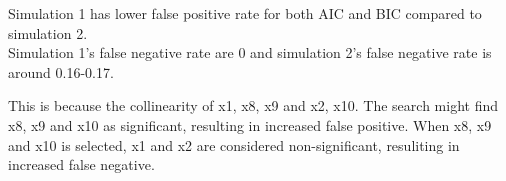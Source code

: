 \documentclass[
]{article}
\begin{document}
Simulation 1 has lower false positive rate for both AIC and BIC compared
to simulation 2.\\
Simulation 1's false negative rate are 0 and simulation 2's false
negative rate is around 0.16-0.17.

This is because the collinearity of x1, x8, x9 and x2, x10. The search
might find x8, x9 and x10 as significant, resulting in increased false
positive. When x8, x9 and x10 is selected, x1 and x2 are considered
non-significant, resuliting in increased false negative.
\end{document}
